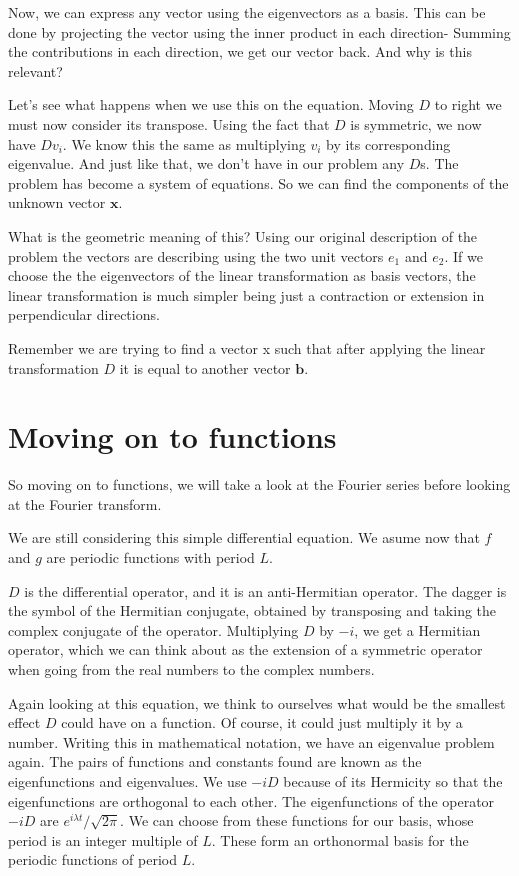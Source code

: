 \documentclass{article}
\newcounter{problem}[section]\setcounter{problem}{1}
\begin{document}
Now, we can express any vector using the eigenvectors as a basis.
This can be done by projecting the vector using the inner product in each direction-
Summing the contributions in each direction, we get our vector back.
And why is this relevant?

Let's see what happens when we use this on the equation.
Moving \(D\) to right we must now consider its transpose.
Using the fact that $D$ is symmetric, we now have $D v_i$. We know this the same as multiplying $v_i$ by its corresponding eigenvalue.
And just like that, we don't have in our problem any $D$s. The problem has become a system of equations.
So we can find the components of the unknown vector $\bm x$.

What is the geometric meaning of this?
Using our original description of the problem the vectors are describing using the two unit vectors \(e_1\) and \(e_2\).
If we choose the the eigenvectors of the linear transformation as basis vectors, the linear transformation is much simpler being just a contraction or extension in perpendicular directions.

Remember we are trying to find a vector x such that after applying the linear transformation \(D\) it is equal to another vector \(\bm b\).




\section{Moving on to functions}

So moving on to functions, we will take a look at the Fourier series before looking at the Fourier transform.

We are still considering this simple differential equation.
We asume now that $f$ and $g$ are periodic functions with period $L$.

$D$ is the differential operator, and it is an anti-Hermitian operator.
The dagger is the symbol of the Hermitian conjugate, obtained by transposing and taking the complex conjugate of the operator.
Multiplying $D$ by $-i$, we get a Hermitian operator, which we can think about as the extension of a symmetric operator when going from the real numbers to the complex numbers.

Again looking at this equation, we think to ourselves what would be the smallest effect $D$ could have on a function.
Of course, it could just multiply it by a number.
Writing this in mathematical notation, we have an eigenvalue problem again. The pairs of functions and constants found are known as the eigenfunctions and eigenvalues.
We use $-iD$ because of its Hermicity so that the eigenfunctions are orthogonal to each other.
The eigenfunctions of the operator $-iD$ are $e^{i\lambda t}/\sqrt{2\pi}$.
We can choose from these functions for our basis, whose period is an integer multiple of $L$.
These form an orthonormal basis for the periodic functions of period $L$.
\end{document}
